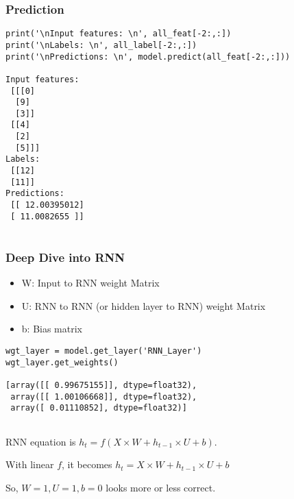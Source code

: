 \begin{frame}[fragile] \frametitle{Prediction}

\begin{lstlisting}
print('\nInput features: \n', all_feat[-2:,:])
print('\nLabels: \n', all_label[-2:,:])
print('\nPredictions: \n', model.predict(all_feat[-2:,:]))

Input features: 
 [[[0]
  [9]
  [3]]
 [[4]
  [2]
  [5]]]
Labels: 
 [[12]
 [11]]
Predictions: 
 [[ 12.00395012]
 [ 11.0082655 ]]
 
\end{lstlisting}
\end{frame}

\begin{frame}[fragile] \frametitle{Deep Dive into RNN}

\begin{itemize}
\item W: Input to RNN weight Matrix
\item U: RNN to RNN (or hidden layer to RNN) weight Matrix
\item b: Bias matrix
\end{itemize}

\begin{lstlisting}
wgt_layer = model.get_layer('RNN_Layer')
wgt_layer.get_weights()

[array([[ 0.99675155]], dtype=float32),
 array([[ 1.00106668]], dtype=float32),
 array([ 0.01110852], dtype=float32)]
 
\end{lstlisting}
RNN equation is $h_t = f(X \times W + h_{t-1} \times U + b)$.

With linear $f$, it becomes $h_t = X \times W + h_{t-1} \times U + b$

So, $W=1,U=1,b=0$ looks more or less correct.
\end{frame}